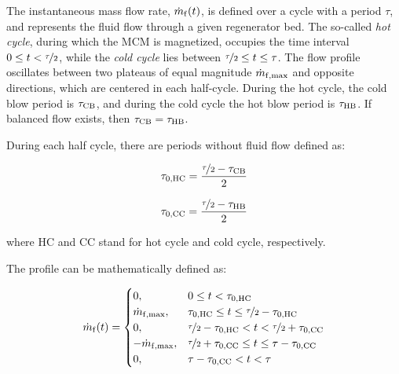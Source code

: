 \documentclass[referee]{svjour3}
\begin{document}
The instantaneous mass flow rate, \(\dot{m}_{\mathrm{f}}(t)\), is defined over a cycle with a period \(\tau\), and represents the fluid flow through a given regenerator bed. The so-called \emph{hot cycle}, during which the MCM is magnetized, occupies the time interval \(0 \le t < \nicefrac{\tau}{2}\), while the \emph{cold cycle} lies between \(\nicefrac{\tau}{2} \le t \le \tau\). The flow profile oscillates between two plateaus of equal magnitude
\(\dot{m}_{\mathrm{f,max}}\) and opposite directions, which are centered in each half-cycle. During the hot cycle, the cold
blow period is \(\tau_{\mathrm{CB}}\), and during the cold cycle the hot blow period is \(\tau_{\mathrm{HB}}\). If balanced flow exists, then \(\tau_{\mathrm{CB}} = \tau_{\mathrm{HB}}\).


During each half cycle, there are periods without  fluid flow defined as:

\begin{equation}
\label{eq:48}
\tau_{\mathrm{0,HC}} = \frac{\nicefrac{\tau}{2} - \tau_{\mathrm{CB}}}{2}
\end{equation}

\begin{equation}
\label{eq:49}
\tau_{\mathrm{0,CC}} = \frac{\nicefrac{\tau}{2} - \tau_{\mathrm{HB}}}{2}
\end{equation}

where HC and CC stand for hot cycle and cold cycle, respectively.


The profile can be mathematically defined as:

\begin{equation}
\dot{m}_{\mathrm{f}}(t)=
\begin{cases}
0, & 0 \le t < \tau_{\mathrm{0,HC}} \\
\dot{m}_{\mathrm{f,max}}, & \tau_{\mathrm{0,HC}} \le t \le \nicefrac{\tau}{2} - \tau_{\mathrm{0,HC}} \\
0, & \nicefrac{\tau}{2} - \tau_{\mathrm{0,HC}} < t < \nicefrac{\tau}{2} + \tau_{\mathrm{0,CC}} \\
-\dot{m}_{\mathrm{f,max}}, & \nicefrac{\tau}{2} + \tau_{\mathrm{0,CC}} \le t \le \tau - \tau_{\mathrm{0,CC}} \\
0, &  \tau - \tau_{\mathrm{0,CC}} <  t < \tau \\
\end{cases}
\label{eq:50}
\end{equation}
\end{document}
